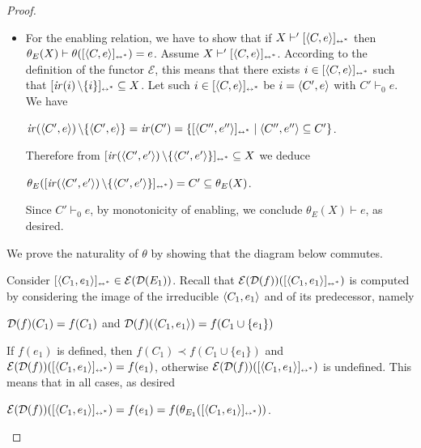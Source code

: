 \begin{proof}
\begin{itemize}
  \item
    For the enabling relation, we have to show that if
    $X \vdash' [{\langle{C}, {e}\rangle}]_{\scriptscriptstyle {\leftrightarrow^*}}$ then
    $\theta_E(X) \vdash \theta([{\langle{C}, {e}\rangle}]_{\scriptscriptstyle {\leftrightarrow^*}}) = e$.
    Assume $X \vdash' [{\langle{C}, {e}\rangle}]_{\scriptscriptstyle {\leftrightarrow^*}}$. According to the
    definition of the functor ${\ensuremath{\mathcal{E}}}$, this means
    that there exists
    $i \in [{\langle{C}, {e}\rangle}]_{\scriptscriptstyle {\leftrightarrow^*}}$ such that
    ${[{\mathop{\mathit{ir}({i})} \setminus \{i \}}]_{\scriptscriptstyle {\leftrightarrow^*}} \subseteq X}$.
    Let such $i \in [{\langle{C}, {e}\rangle}]_{\scriptscriptstyle {\leftrightarrow^*}}$ be $i = \langle{C'}, {e}\rangle$
    with $C' \vdash_0 {e}$. We have
    \begin{center}
      $\mathop{\mathit{ir}({\langle{C'}, {e}\rangle})} \setminus \{ \langle{C'}, {e}\rangle \} = \mathop{\mathit{ir}({C'})} = \{
      [{\langle{ C''}, { e''}\rangle}]_{\scriptscriptstyle {\leftrightarrow^*}} \mid \langle{ C''}, { e''}\rangle \subseteq C'\}$.
    \end{center}    
    Therefore from
    $[{\mathop{\mathit{ir}({\langle{C'}, {e'}\rangle})} \setminus \{ \langle{C'}, {e'}\rangle \}}]_{\scriptscriptstyle {\leftrightarrow^*}} \subseteq X$
    we deduce
    \begin{center}
      $\theta_E([{\mathop{\mathit{ir}({\langle{C'}, {e'}\rangle})} \setminus \{ \langle{C'}, {e'}\rangle \}}]_{\scriptscriptstyle {\leftrightarrow^*}}) = C' \subseteq \theta_E(X)$.
    \end{center}
    Since $C' \vdash_0 e$, by monotonicity of enabling, we conclude
    $\theta_E(X) \vdash e$, as desired.
  \end{itemize}

  We prove the naturality of $\theta$ by showing that the
  diagram below commutes.
  \begin{center}
  \end{center}
  Consider $[{\langle{C_1}, {e_1}\rangle}]_{\scriptscriptstyle {\leftrightarrow^*}} \in \mathcal{E}({\mathcal{D}({{E}_1})})$.
  Recall that $\mathcal{E}({\mathcal{D}({f})})([{\langle{C_1}, {e_1}\rangle}]_{\scriptscriptstyle {\leftrightarrow^*}})$ is computed
  by considering the image of the irreducible
  $\langle{C_1}, {e_1}\rangle$ and of its predecessor, namely
  \begin{center}
    $\mathcal{D}({f})(C_1) = f(C_1)$ and $\mathcal{D}({f})(\langle{C_1}, {e_1}\rangle) = f(C_1 \cup\{e_1\})$
  \end{center}
  If $f(e_1)$ is defined, then $f(C_1) \prec f(C_1 \cup\{e_1\})$ and
  $\mathcal{E}({\mathcal{D}({f})})([{\langle{C_1}, {e_1}\rangle}]_{\scriptscriptstyle {\leftrightarrow^*}}) = f(e_1)$, otherwise
  $\mathcal{E}({\mathcal{D}({f})})([{\langle{C_1}, {e_1}\rangle}]_{\scriptscriptstyle {\leftrightarrow^*}})$ is undefined. This means
  that in all cases, as desired
  \begin{center}
    $\mathcal{E}({\mathcal{D}({f})})([{\langle{C_1}, {e_1}\rangle}]_{\scriptscriptstyle {\leftrightarrow^*}}) = f(e_1) =
    f(\theta_{{E}_1}([{\langle{C_1}, {e_1}\rangle}]_{\scriptscriptstyle {\leftrightarrow^*}}))$.
  \end{center}
  

\end{proof}
